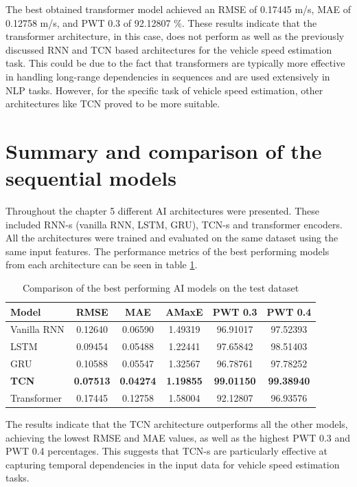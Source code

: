 The best obtained transformer model achieved an RMSE of 0.17445 m/s, MAE of 0.12758 m/s, and PWT 0.3 of 92.12807 \%. These results indicate that the transformer architecture, in this case, does not perform as well as the previously discussed RNN and TCN based architectures for the vehicle speed estimation task. This could be due to the fact that transformers are typically more effective in handling long-range dependencies in sequences and are used extensively in NLP tasks. However, for the specific task of vehicle speed estimation, other architectures like TCN proved to be more suitable.

\section{Summary and comparison of the sequential models}
\label{sec:ai_summary}

Throughout the chapter 5 different AI architectures were presented. These included RNN-s (vanilla RNN, LSTM, GRU), TCN-s and transformer encoders. All the architectures were trained and evaluated on the same dataset using the same input features. The performance metrics of the best performing models from each architecture can be seen in table \ref{tab:ai_model_comparison}.

\FloatBarrier
\begin{table}[h]
    \centering
    \begin{tabular}{|l|c|c|c|c|c|}
        \hline
        \textbf{Model} & \textbf{RMSE} & \textbf{MAE} & \textbf{AMaxE} & \textbf{PWT 0.3} & \textbf{PWT 0.4} \\
        \hline \hline
        Vanilla RNN & 0.12640 & 0.06590 & 1.49319 & 96.91017 & 97.52393 \\
        \hline
        LSTM & 0.09454 & 0.05488 & 1.22441 & 97.65842 & 98.51403 \\
        \hline
        GRU & 0.10588 & 0.05547 & 1.32567 & 96.78761 & 97.78252 \\
        \hline
        \textbf{TCN} & \textbf{0.07513} & \textbf{0.04274} & \textbf{1.19855} & \textbf{99.01150} & \textbf{99.38940} \\
        \hline
        Transformer & 0.17445 & 0.12758 & 1.58004 & 92.12807 & 96.93576 \\
        \hline
    \end{tabular}
    \caption{Comparison of the best performing AI models on the test dataset}
    \label{tab:ai_model_comparison}
\end{table}
\FloatBarrier

The results indicate that the TCN architecture outperforms all the other models, achieving the lowest RMSE and MAE values, as well as the highest PWT 0.3 and PWT 0.4 percentages. This suggests that TCN-s are particularly effective at capturing temporal dependencies in the input data for vehicle speed estimation tasks.